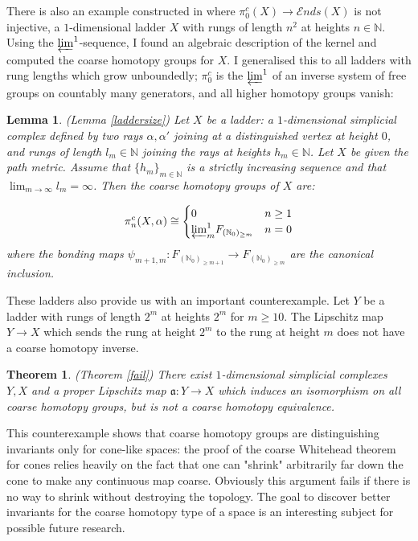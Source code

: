 \documentclass[a4paper,11pt]{article}
\theoremstyle{definition}
\theoremstyle{plain}
\newtheorem*{theorem*}{Theorem}
\newtheorem*{lemma*}{Lemma}
\theoremstyle{remark}
\begin{document}
There is also an example constructed in \cite{ashley2025interactions} where  $\pi^c_{0}(X)\rightarrow \mathcal{E}nds(X)$ is not injective, a $1$-dimensional ladder $X$ with rungs of length $n^2$ at heights $n\in \mathbb{N}$. Using the $\varprojlim^1$-sequence, I found an algebraic description of the kernel and computed the coarse homotopy groups for $X$. I  generalised this to all ladders with rung lengths which grow unboundedly; $\pi_{0}^{c}$ is the $\varprojlim^1$ of an inverse system of free groups on countably many generators, and all higher homotopy groups vanish:



\begin{lemma*} (Lemma \ref{laddersize}) Let $X$ be a ladder: a $1$-dimensional simplicial complex defined by two rays $\alpha,\alpha'$ joining at a distinguished vertex at height $0$, and rungs of length $l_{m}\in \mathbb{N}$  joining the rays at heights $h_{m} \in \mathbb{N}$. Let $X$ be given the path metric. Assume that $\{h_{m}\}_{m\in \mathbb{N}}$ is a strictly increasing sequence and that $\lim_{m\rightarrow \infty} l_{m}=\infty$. Then the coarse homotopy groups of $X$ are:

\[ \pi_{n}^{c}(X,\alpha) \cong \begin{cases} 
       0 &n\geq 1  \\
        {\varprojlim}^1_{m}  F_{(\mathbb{N}_{0})_{\geq m}} & n=0 \\ 
       \end{cases}
    \]
where the bonding maps $\psi_{m+1,m}: F_{(\mathbb{N}_{0})_{\geq m+1}} \rightarrow F_{(\mathbb{N}_{0})_{\geq m}}$ are the canonical inclusion. 
\end{lemma*}

These ladders also provide us with an important counterexample. Let $Y$ be a ladder with rungs of length $2^m$ at heights $2^m$ for $m\geq 10$. The Lipschitz map $Y\rightarrow X$ which sends the rung at height  $2^m$ to the rung at height $m$ does not have a coarse homotopy inverse.

\begin{theorem*} (Theorem \ref{fail}) There exist $1$-dimensional simplicial complexes $Y,X$ and a proper Lipschitz map $\mathfrak{a}: Y\rightarrow X$ which induces an isomorphism on all coarse homotopy groups, but is not a coarse homotopy equivalence.
\end{theorem*}

This counterexample shows that coarse homotopy groups are distinguishing invariants only for cone-like spaces: the proof of the coarse Whitehead theorem for cones relies heavily on the fact that one can "shrink" arbitrarily far down the cone to make any continuous map coarse. Obviously this argument fails if there is no way to shrink without destroying the topology. The goal to discover better invariants for the coarse homotopy type of a space is an interesting subject for possible future research.
\end{document}
